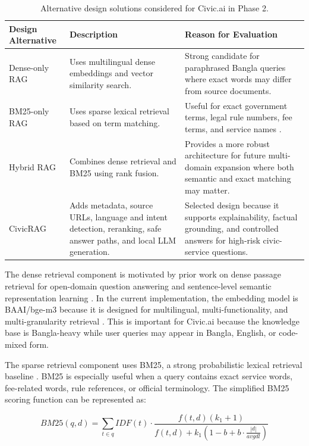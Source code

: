 \begin{table}[h]
\centering
\caption{Alternative design solutions considered for Civic.ai in Phase 2.}
\begin{tabular}{|p{3.2cm}|p{5.4cm}|p{5.2cm}|}
\hline
\textbf{Design Alternative} & \textbf{Description} & \textbf{Reason for Evaluation} \\
\hline
Dense-only RAG & Uses multilingual dense embeddings and vector similarity search. & Strong candidate for paraphrased Bangla queries where exact words may differ from source documents. \\
\hline
BM25-only RAG & Uses sparse lexical retrieval based on term matching. & Useful for exact government terms, legal rule numbers, fee terms, and service names \cite{robertson2009bm25}. \\
\hline
Hybrid RAG & Combines dense retrieval and BM25 using rank fusion. & Provides a more robust architecture for future multi-domain expansion where both semantic and exact matching may matter. \\
\hline
CivicRAG & Adds metadata, source URLs, language and intent detection, reranking, safe answer paths, and local LLM generation. & Selected design because it supports explainability, factual grounding, and controlled answers for high-risk civic-service questions. \\
\hline
\end{tabular}
\end{table}

The dense retrieval component is motivated by prior work on dense passage retrieval for open-domain question answering \cite{karpukhin2020dpr} and sentence-level semantic representation learning \cite{reimers2019sbert}. In the current implementation, the embedding model is BAAI/bge-m3 because it is designed for multilingual, multi-functionality, and multi-granularity retrieval \cite{chen2024bgem3}. This is important for Civic.ai because the knowledge base is Bangla-heavy while user queries may appear in Bangla, English, or code-mixed form.

The sparse retrieval component uses BM25, a strong probabilistic lexical retrieval baseline \cite{robertson2009bm25}. BM25 is especially useful when a query contains exact service words, fee-related words, rule references, or official terminology. The simplified BM25 scoring function can be represented as:

\begin{equation}
BM25(q,d)=\sum_{t \in q} IDF(t)\cdot
\frac{f(t,d)(k_1+1)}
{f(t,d)+k_1(1-b+b\cdot\frac{|d|}{avgdl})}
\end{equation}


